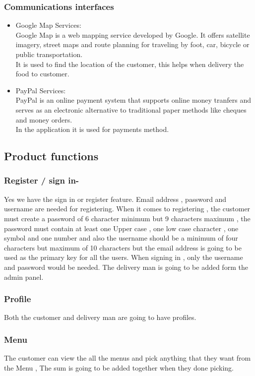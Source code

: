 \documentclass[12pt]{article}
\begin{document}
\subsubsection{Communications interfaces}
\begin{itemize}
	\item Google Map Services: \\
	Google Map is a web mapping service developed by Google. It offers satellite imagery, street maps and route planning for traveling by foot, car, bicycle or public transportation.\\
	It is used to find the location of the customer, this helps when delivery the food to customer.

	\item PayPal Services: \\
	PayPal is an online payment system that supports online money tranfers and serves as an electronic alternative to traditional paper methods like cheques and money orders. \\
	In the application it is used for payments method.\\
	
\end{itemize}
\subsection{Product functions}
\subsubsection{Register / sign in-}
Yes  we have the sign in or register feature. Email address , password and username are needed for registering. When it comes to registering , the customer must create a password of  6 character minimum but 9 characters maximum , the password must contain  at least one Upper case , one low case character , one symbol and one number and also the username should be a minimum of four characters but maximum of 10 characters   but the email address is going to be used as the primary key for all the users. When signing in , only the username and password would be needed. The delivery man is going to be added form the admin panel.

\subsubsection{Profile }
Both the customer and delivery man are going to have profiles.

\subsubsection{Menu}
The customer can view the all the menus and pick anything that they want from the Menu , The sum is going to be added together  when they  done picking.
\end{document}
